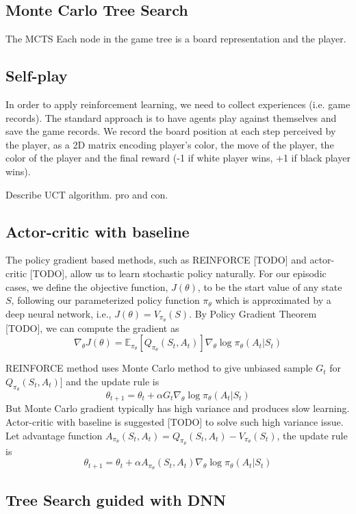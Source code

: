 \documentclass{article}
\begin{document}
\subsection{Monte Carlo Tree Search}
The MCTS 
Each node in the game tree is a board representation and the player.

\subsection{Self-play}
In order to apply reinforcement learning, we need to collect experiences (i.e. game records). The standard approach is to have agents play against themselves and save the game records. We record the board position at each step perceived by the player, as a 2D matrix encoding player's color, the move of the player, the color of the player and the final reward (-1 if white player wins, +1 if black player wins).

Describe UCT algorithm. pro and con.
\subsection{Actor-critic with baseline}
The policy gradient based methods, such as REINFORCE [TODO] and actor-critic [TODO], allow us to learn stochastic policy naturally. For our episodic cases, we define the objective function, $J(\theta)$, to be the start value of any state $S$, following our parameterized policy function $\pi_{\theta}$ which is approximated by a deep neural network, i.e.,  $J(\theta) = V_{\pi_{\theta}}(S)$. By Policy Gradient Theorem [TODO], we can compute the gradient as
$$ \nabla_{\theta} J(\theta) =  \mathbb E_{\pi_{\theta}} [ 
Q_{\pi_{\theta}}(S_t, A_t)] 
\nabla_{\theta} \log \pi_{\theta}(A_t|S_t) 
$$

REINFORCE method uses Monte Carlo method to give unbiased sample $G_t$ for $Q_{\pi_{\theta}}(S_t, A_t)]$ and the update rule is
$$ \theta_{t+1} = \theta_{t} + \alpha 
G_t 
\nabla_{\theta} \log \pi_{\theta}(A_t|S_t) 
$$
But Monte Carlo gradient typically has high variance and produces slow learning. Actor-critic with baseline is suggested [TODO] to solve such high variance issue. Let advantage function $
A_{\pi_{\theta}}(S_t, A_t) 
= 
Q_{\pi_{\theta}}(S_t, A_t)  - 
V_{\pi_{\theta}}(S_t) 
$, the update rule is
$$ \theta_{t+1} = \theta_{t} + \alpha 
A_{\pi_{\theta}}(S_t, A_t) 
\nabla_{\theta} \log \pi_{\theta}(A_t|S_t) 
$$

\subsection{Tree Search guided with DNN}
\end{document}
